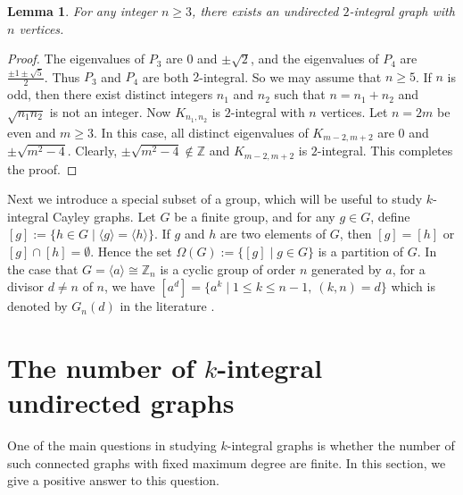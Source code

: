 \documentclass[12pt,a4paper]{article}
\newtheorem{lem}[thm]{Lemma}
\def \leq {\leqslant}
\def \geq {\geqslant}
\begin{document}
	
	\begin{lem}
		For any integer $n\geq 3$, there exists an undirected $2$-integral graph with $n$ vertices.
	\end{lem}
	\begin{proof}
		The eigenvalues of $P_3$ are $0$ and $\pm \sqrt{2}$, and the eigenvalues of $P_4$ are $\frac{\pm 1\pm \sqrt{5}}{2}$.
		Thus $P_3$ and $P_4$ are both $2$-integral. So we may assume that $n\geq 5$. If $n$ is odd, then there exist distinct integers $n_1$ and $n_2$ such that $n=n_1+n_2$ and $\sqrt{n_1n_2}$ is not an integer. Now $K_{n_1,n_2}$ is $2$-integral with $n$ vertices. Let $n=2m$ be even and $m\geq 3$. In this case, all distinct eigenvalues of $K_{m-2,m+2}$ are $0$ and $\pm\sqrt{m^2-4}$.
		Clearly, $\pm\sqrt{m^2-4}\notin \mathbb{Z}$ and $K_{m-2,m+2}$ is $2$-integral. This completes the proof.
	\end{proof}
	
	Next we introduce a special subset of a group, which will be useful to study $k$-integral Cayley graphs.
	Let $G$ be a finite  group, and for any $g\in G$, define $[g]:=\{h\in G\mid \langle g\rangle=\langle h\rangle\}$. If $g$ and $h$ are two  elements of $G$, then $[g]=[h]$ or
	$[g]\cap [h]=\emptyset$. Hence the set $\Omega(G):=\{[g]\mid g\in G\}$ is a partition of $G$. 
	In the case that $G=\langle a\rangle\cong \mathbb Z_n$ is a cyclic group of order $n$ generated by $a$, for a divisor $d\neq n$ of $n$, we have 
	$[a^d]=\{a^k\mid 1\leq k\leq n-1,~(k,n)=d\}$ which is denoted by $G_n(d)$ in the literature \cite{So}.  
	
	\section{The number of $k$-integral undirected graphs}
	One of the main questions in studying $k$-integral graphs is whether the number of such connected graphs with fixed maximum degree are finite. In this section, we give a positive answer to this question.
	
\end{document}
